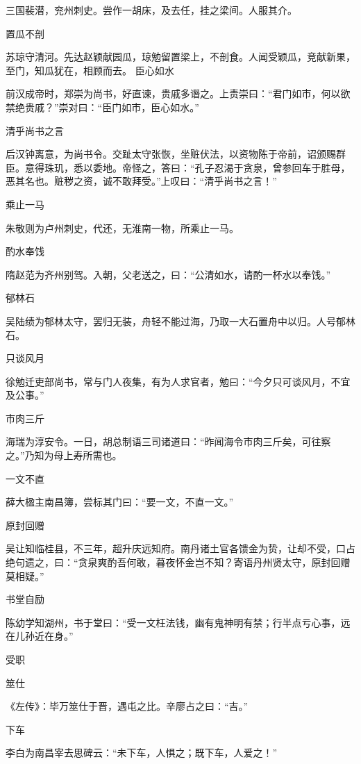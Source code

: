 \documentclass[a4paper,12pt,UTF8,twoside]{ctexbook}
\begin{document}
    三国裴潜，兖州刺史。尝作一胡床，及去任，挂之梁间。人服其介。
    
    置瓜不剖
    
    苏琼守清河。先达赵颖献园瓜，琼勉留置梁上，不剖食。人闻受颖瓜，竞献新果，至门，知瓜犹在，相顾而去。
    臣心如水
    
    前汉成帝时，郑崇为尚书，好直谏，贵戚多谮之。上责崇曰：“君门如市，何以欲禁绝贵戚？”崇对曰：“臣门如市，臣心如水。”
    
    清乎尚书之言
    
    后汉钟离意，为尚书令。交趾太守张恢，坐赃伏法，以资物陈于帝前，诏颁赐群臣。意得珠玑，悉以委地。帝怪之，答曰：“孔子忍渴于贪泉，曾参回车于胜母，恶其名也。赃秽之资，诚不敢拜受。”上叹曰：“清乎尚书之言！”
    
    乘止一马
    
    朱敬则为卢州刺史，代还，无淮南一物，所乘止一马。
    
    酌水奉饯
    
    隋赵范为齐州别驾。入朝，父老送之，曰：“公清如水，请酌一杯水以奉饯。”
    
    郁林石
    
    吴陆绩为郁林太守，罢归无装，舟轻不能过海，乃取一大石置舟中以归。人号郁林石。
    
    只谈风月
    
    徐勉迁吏部尚书，常与门人夜集，有为人求官者，勉曰：“今夕只可谈风月，不宜及公事。”
    
    市肉三斤
    
    海瑞为淳安令。一日，胡总制语三司诸道曰：“昨闻海令市肉三斤矣，可往察之。”乃知为母上寿所需也。
    
    一文不直
    
    薛大楹主南昌簿，尝标其门曰：“要一文，不直一文。”
    
    原封回赠
    
    吴让知临桂县，不三年，超升庆远知府。南丹诸土官各馈金为贽，让却不受，口占绝句遗之，曰：“贪泉爽酌吾何敢，暮夜怀金岂不知？寄语丹州贤太守，原封回赠莫相疑。”
    
    书堂自励
    
    陈幼学知湖州，书于堂曰：“受一文枉法钱，幽有鬼神明有禁；行半点亏心事，远在儿孙近在身。”
    
    受职
    
    筮仕
    
    《左传》：毕万筮仕于晋，遇屯之比。辛廖占之曰：“吉。”
    
    下车
    
    李白为南昌宰去思碑云：“未下车，人惧之；既下车，人爱之！”
    
\end{document}
